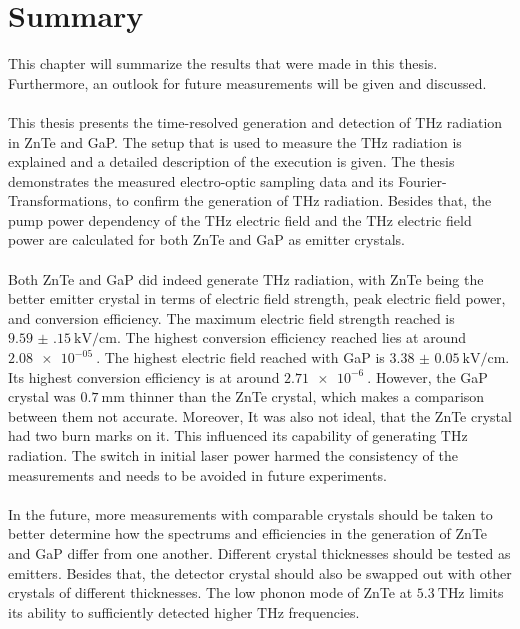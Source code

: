 \chapter{Summary}
\label{sec:summary}
This chapter will summarize the results that were made in this thesis.
Furthermore, an outlook for future measurements will be given and discussed.
\\\\
This thesis presents the time-resolved generation and detection of $\si{\tera\hertz}$ radiation in ZnTe and GaP.
The setup that is used to measure the $\si{\tera\hertz}$ radiation is explained and a detailed description of the execution is given.
The thesis demonstrates the measured electro-optic sampling data and its Fourier-Transformations, to confirm the generation of $\si{\tera\hertz}$ radiation.
Besides that, the pump power dependency of the $\si{\tera\hertz}$ electric field and the $\si{\tera\hertz}$ electric field power are calculated for both ZnTe and GaP as emitter crystals.
\\\\
Both ZnTe and GaP did indeed generate $\si{\tera\hertz}$ radiation, with ZnTe being the better emitter crystal in terms of electric field strength, peak electric field power, and conversion efficiency.
The maximum electric field strength reached is $\SI{9.59(15)}{\kilo\V\per\centi\meter}$.
The highest conversion efficiency reached lies at around $\SI{2.08e-05}{}$.
The highest electric field reached with GaP is $\SI{3.38(5)}{\kilo\V\per\centi\meter}$.
Its highest conversion efficiency is at around $\SI{2.71e-6}{}$.
However, the GaP crystal was $\SI{0.7}{\milli\meter}$ thinner than the ZnTe crystal, which makes a comparison between them not accurate.
Moreover, It was also not ideal, that the ZnTe crystal had two burn marks on it.
This influenced its capability of generating $\si{\tera\hertz}$ radiation.
The switch in initial laser power harmed the consistency of the measurements and needs to be avoided in future experiments.
\\\\
In the future, more measurements with comparable crystals should be taken to better determine how the spectrums and efficiencies in the generation of ZnTe and GaP differ from one another.
Different crystal thicknesses should be tested as emitters.
Besides that, the detector crystal should also be swapped out with other crystals of different thicknesses.
The low phonon mode of ZnTe at $\SI{5.3}{\tera\hertz}$ \cite{phonon_modes} \cite{phonon_ZnTe} limits its ability to sufficiently detected higher $\si{\tera\hertz}$ frequencies.
